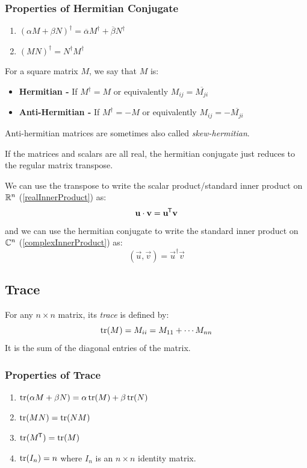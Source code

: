 \documentclass[../main.tex]{subfiles}
\begin{document}
\subsubsection{Properties of Hermitian Conjugate}
\begin{enumerate}
  \item $(\alpha M + \beta N)^{\dag} = \overline{\alpha}M^{\dag} + \overline{\beta}N^{\dag}$
  \item $(MN)^{\dag} = N^{\dag} M^{\dag}$
\end{enumerate}
\begin{definition}
  For a square matrix $M$, we say that $M$ is:
  \begin{itemize}
    \item \textbf{Hermitian -} If $M^{\dag} = M$ or equivalently $M_{i j} = \overline{M_{j i}}$
    \item \textbf{Anti-Hermitian -} If $M^{\dag} = -M$ or equivalently $M_{i j} = -\overline{M_{j i}}$
  \end{itemize}
  Anti-hermitian matrices are sometimes also called \textit{skew-hermitian}.
\end{definition}
\begin{remark}[Note]
  If the matrices and scalars are all real, the hermitian conjugate just reduces to the regular matrix transpose.
\end{remark}
\begin{remark}
  We can use the transpose to write the scalar product/standard inner product on $\mathbb{R}^n$ (\cref{realInnerProduct}) as:
  \[
    \mathbf{\bm{u}} \cdot \mathbf{\bm{v}} = \mathbf{\bm{u}}^{{\mkern-1.5mu\mathsf{T}}}\mathbf{\bm{v}}
  \]
  and we can use the hermitian conjugate to write the standard inner product on $\mathbb{C}^n$ (\cref{complexInnerProduct}) as:
  \[
    (\vec{u}, \vec{v}) = \vec{u}^{\dag}\vec{v}
  \]
\end{remark}
\subsection{Trace}
\begin{definition}[Trace]
  For any $n \times n$ matrix, its \textit{trace} is defined by:
  \[
    \operatorname{tr}(M) = M_{i i} = M_{1 1} + \cdots M_{n n}
  \]
  It is the sum of the diagonal entries of the matrix.
\end{definition}
\subsubsection{Properties of Trace}
\begin{enumerate}
  \item $\operatorname{tr}(\alpha M + \beta N) = \alpha \operatorname{tr}(M) + \beta \operatorname{tr}(N)$
  \item $\operatorname{tr}(MN) = \operatorname{tr}(NM)$
  \item $\operatorname{tr}(M^{{\mkern-1.5mu\mathsf{T}}}) = \operatorname{tr}(M)$
  \item $\operatorname{tr}(I_n) = n$ where $I_n$ is an $n \times n$ identity matrix.
\end{enumerate}
\end{document}

